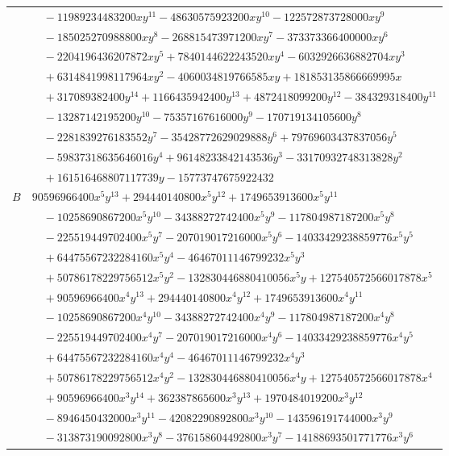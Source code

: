 \documentclass[11pt]{article}
\begin{document}
\begin{longtable}{@{}ll@{}}
 & $\quad -11989234483200xy^{11}-48630575923200xy^{10}-122572873728000xy^{9}$\\
 & $\quad -185025270988800xy^{8}-268815473971200xy^{7}-373373366400000xy^{6}$\\
 & $\quad -2204196436207872xy^{5}+7840144622243520xy^{4}-6032926636882704xy^{3}$\\
 & $\quad +6314841998117964xy^{2}-4060034819766585xy+181853135866669995x$\\
 & $\quad +317089382400y^{14}+1166435942400y^{13}+4872418099200y^{12}-384329318400y^{11}$\\
 & $\quad -13287142195200y^{10}-75357167616000y^{9}-170719134105600y^{8}$\\
 & $\quad -2281839276183552y^{7}-35428772629029888y^{6}+79769603437837056y^{5}$\\
 & $\quad -59837318635646016y^{4}+96148233842143536y^{3}-33170932748313828y^{2}$\\
 & $\quad +161516468807117739y-15773747675922432$\\
$B$ & $90596966400x^{5}y^{13}+294440140800x^{5}y^{12}+1749653913600x^{5}y^{11}$\\
 & $\quad -10258690867200x^{5}y^{10}-34388272742400x^{5}y^{9}-117804987187200x^{5}y^{8}$\\
 & $\quad -225519449702400x^{5}y^{7}-207019017216000x^{5}y^{6}-14033429238859776x^{5}y^{5}$\\
 & $\quad +64475567232284160x^{5}y^{4}-46467011146799232x^{5}y^{3}$\\
 & $\quad +50786178229756512x^{5}y^{2}-132830446880410056x^{5}y+127540572566017878x^{5}$\\
 & $\quad +90596966400x^{4}y^{13}+294440140800x^{4}y^{12}+1749653913600x^{4}y^{11}$\\
 & $\quad -10258690867200x^{4}y^{10}-34388272742400x^{4}y^{9}-117804987187200x^{4}y^{8}$\\
 & $\quad -225519449702400x^{4}y^{7}-207019017216000x^{4}y^{6}-14033429238859776x^{4}y^{5}$\\
 & $\quad +64475567232284160x^{4}y^{4}-46467011146799232x^{4}y^{3}$\\
 & $\quad +50786178229756512x^{4}y^{2}-132830446880410056x^{4}y+127540572566017878x^{4}$\\
 & $\quad +90596966400x^{3}y^{14}+362387865600x^{3}y^{13}+1970484019200x^{3}y^{12}$\\
 & $\quad -8946450432000x^{3}y^{11}-42082290892800x^{3}y^{10}-143596191744000x^{3}y^{9}$\\
 & $\quad -313873190092800x^{3}y^{8}-376158604492800x^{3}y^{7}-14188693501771776x^{3}y^{6}$\\

\end{longtable}
\end{document}
